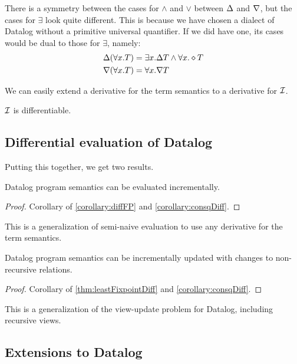 There is a symmetry between the cases for $\wedge$ and $\vee$ between $\Delta$
and $\nabla$, but the cases for $\exists$ look quite different.
This is because we have chosen a dialect of Datalog without a primitive universal quantifier.
If we did have one, its cases would be dual to those for $\exists$, namely:
\begin{align*}
\Delta(\forall x.T) &= \exists x. \Delta T \wedge \forall x. \diamond T\\
\nabla(\forall x.T) &= \forall x. \nabla T
\end{align*}

We can easily extend a derivative for the term semantics to a derivative for $\mathcal{I}$.

\begin{corollary}
\label{corollary:consqDiff}
  $\mathcal{I}$ is differentiable.
\end{corollary}

\subsection{Differential evaluation of Datalog}

Putting this together, we get two results.

\begin{thm}
\label{thm:diffEval}
  Datalog program semantics can be evaluated incrementally.
\end{thm}
\ifproofs
\begin{proof}
  Corollary of \cref{corollary:diffFP} and \cref{corollary:consqDiff}.
\end{proof}
\fi

This is a generalization of semi-naive evaluation to use any derivative for the
term semantics.

\begin{thm}
\label{thm:diffUpdate}
  Datalog program semantics can be incrementally updated with changes to non-recursive relations.
\end{thm}
\ifproofs
\begin{proof}
  Corollary of \cref{thm:leastFixpointDiff} and \cref{corollary:consqDiff}.
\end{proof}
\fi

This is a generalization of the view-update problem for Datalog, including recursive views.

\subsection{Extensions to Datalog}

